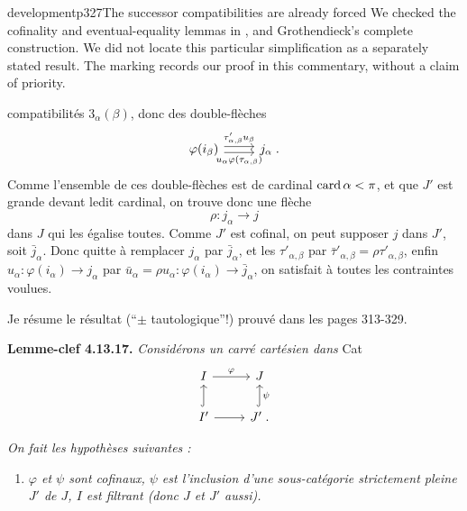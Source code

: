 \begin{dcomment}{development}{p327}{The successor compatibilities are already forced}
We checked the cofinality and eventual-equality lemmas in \citet{StacksCofinal,StacksFiltered}, and Grothendieck's complete construction. We did not locate this particular simplification as a separately stated result. The marking records our proof in this commentary, without a claim of priority.
\end{dcomment}



compatibilités $3_\alpha(\beta)$, donc des double-flèches
\[
\begin{tikzcd}
\varphi(i_\beta) \arrow[r, shift left, "\tau'_{\alpha,\beta}u_\beta"] \arrow[r, shift right, "u_\alpha\varphi(\tau_{\alpha,\beta})"'] & j_\alpha \; .
\end{tikzcd}
\]
Comme l'ensemble de ces double-flèches est de cardinal $\operatorname{card}\alpha < \pi$, et que $J'$ est grande devant ledit cardinal, on
trouve donc une flèche
\[
\rho : j_\alpha \longrightarrow j
\]
dans $J$ qui les égalise toutes. Comme $J'$ est cofinal, on peut supposer $j$ dans $J'$, soit $\bar{j}_\alpha$. Donc quitte à remplacer $j_\alpha$ par $\bar{j}_\alpha$, et les $\tau'_{\alpha,\beta}$ par $\bar{\tau}'_{\alpha,\beta} = \rho\tau'_{\alpha,\beta}$, enfin $u_\alpha : \varphi(i_\alpha) \longrightarrow j_\alpha$ par $\bar{u}_\alpha = \rho u_\alpha : \varphi(i_\alpha) \longrightarrow \bar{j}_\alpha$, on satisfait à toutes les contraintes voulues.

Je résume le résultat (``$\pm$ tautologique''!) prouvé dans les pages 313-329.

\textbf{Lemme-clef 4.13.17.} \textit{Considérons un carré cartésien dans} Cat
\[
\begin{tikzcd}
I \arrow[r, "\varphi"] & J \\
I' \arrow[u, hook] \arrow[r] & J' \arrow[u, hook, "\psi"'] \; .
\end{tikzcd}
\]

\textit{On fait les hypothèses suivantes :}


\begin{enumerate}[label={}]
\item[\textit{1)}] \textit{$\varphi$ et $\psi$ sont cofinaux, $\psi$ est l'inclusion d'une sous-catégorie strictement pleine $J'$ de $J$, $I$ est filtrant (donc $J$ et $J'$ aussi).}
\end{enumerate}

